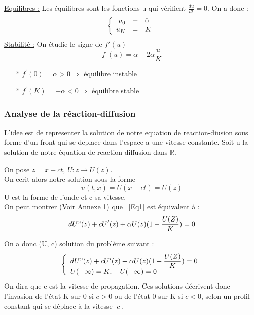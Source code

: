 \documentclass[a4paper,11pt]{article}
\begin{document}
\noindent\underline{Equilibres :} Les équilibres sont les fonctions u qui vérifient $\frac{du}{dt}=0$. On a donc :
\[
\left\{
\begin{array}{r c l}
u_0 &=& 0\\
u_K &=& K\\
\end{array}
\right.
\]
\underline{Stabilité :} On étudie le signe de $f'(u)$ 
$$f^\prime(u)= \alpha - 2 \alpha \dfrac{u}{K} $$

\begin{itemize}
    	\item[*] $f^\prime(0)=\alpha >0 \Rightarrow $ équilibre instable
        \item[*] $f^\prime(K)= -\alpha <0 \Rightarrow $ équilibre stable
	\end{itemize}


\subsubsection{Analyse de la réaction-diffusion}
\setcounter{equation}{0}
L'idee est de representer la solution de notre equation de
reaction-diusion sous forme d'un front qui se deplace dans l'espace a une vitesse constante.
Soit u la solution de notre équation de reaction-diffusion dans $\mathbb{R}$.

\noindent On pose $z=x-ct$, $U:z\rightarrow U(z)$.\\
On ecrit alors notre solution sous la forme
\begin{equation}
u(t,x)=U(x-ct)=U(z)
\label{Eq1}
\end{equation}
U est la forme de l'onde et c sa vitesse.\\

On peut montrer (Voir Annexe 1) que ~\eqref{Eq1} est équivalent à :
\begin{equation*}
dU"(z)+c U'(z)+\alpha U(z)(1-\dfrac{U(Z)}{K})=0\\
\end{equation*} 

On a donc (U, c) solution du problème suivant :
\begin{equation} 
\left\{
\begin{array}{lcl}
dU"(z)+c U'(z)+\alpha U(z)(1-\dfrac{U(Z)}{K})=0 \\
U( - \infty )= K ,\quad U( + \infty )=0
\end{array}
\right.
\label{PbKPP }
\end{equation}
On dira que c est la vitesse de propagation. Ces solutions décrivent donc l'invasion de l'état K
sur 0 si $c > 0$ ou de l'état 0 sur K si $c< 0$, selon un profil constant qui se déplace à la vitesse
$|c|$.\\
\newline
\end{document}
